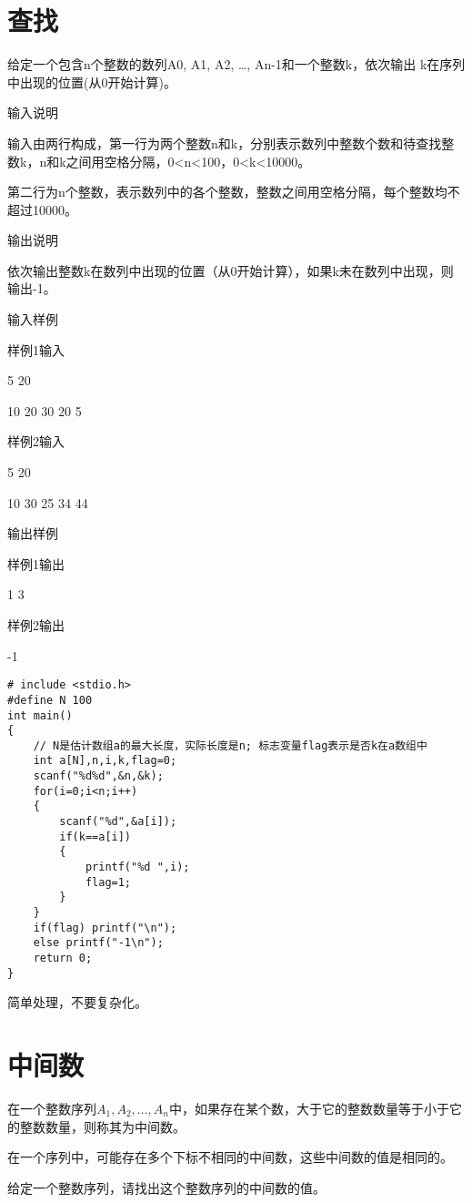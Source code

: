 \section{查找}	
给定一个包含n个整数的数列A0, A1, A2, \dots, An-1和一个整数k，依次输出 k在序列中出现的位置(从0开始计算)。

输入说明	

输入由两行构成，第一行为两个整数n和k，分别表示数列中整数个数和待查找整数k，n和k之间用空格分隔，0<n<100，0<k<10000。

第二行为n个整数，表示数列中的各个整数，整数之间用空格分隔，每个整数均不超过10000。

输出说明	

依次输出整数k在数列中出现的位置（从0开始计算），如果k未在数列中出现，则输出-1。

输入样例

样例1输入
	
5 20

10 20 30 20 5

样例2输入

5 20

10 30 25 34 44

输出样例
	
样例1输出

1 3

样例2输出

-1

\begin{lstlisting}
# include <stdio.h>
#define N 100
int main()
{
	// N是估计数组a的最大长度，实际长度是n; 标志变量flag表示是否k在a数组中
	int a[N],n,i,k,flag=0; 
	scanf("%d%d",&n,&k);
	for(i=0;i<n;i++)
	{
		scanf("%d",&a[i]);
		if(k==a[i]) 
		{
			printf("%d ",i);
			flag=1;
		}
	} 
	if(flag) printf("\n");
	else printf("-1\n");
	return 0;
}
\end{lstlisting}

\begin{note}[要点]
	简单处理，不要复杂化。
\end{note}

\section{中间数}
在一个整数序列$A_1, A_2,\dots, A_n$中，如果存在某个数，大于它的整数数量等于小于它的整数数量，则称其为中间数。

在一个序列中，可能存在多个下标不相同的中间数，这些中间数的值是相同的。 

给定一个整数序列，请找出这个整数序列的中间数的值。 

